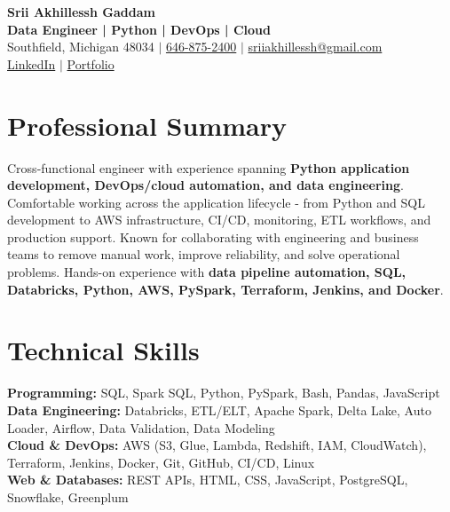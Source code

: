 \documentclass[letterpaper,10pt]{article}
\begin{document}
\fontsize{9.35pt}{10.45pt}\selectfont

\begin{center}
    {\LARGE \textbf{Srii Akhillessh Gaddam}} \\[-1pt]
    \textbf{Data Engineer | Python | DevOps | Cloud} \\[2pt]
    Southfield, Michigan 48034 $|$
    \href{tel:6468752400}{646-875-2400} $|$
    \href{mailto:sriiakhillessh@gmail.com}{sriiakhillessh@gmail.com} \\[1pt]
    \href{https://www.linkedin.com/in/srii-akhiilessh-gaddam-b48668191/}{LinkedIn} $|$
    \href{https://sriiakhillesshg.github.io/portfolio/}{Portfolio}
\end{center}
\vspace{-8pt}

\section{Professional Summary}
\small{Cross-functional engineer with experience spanning \textbf{Python application development, DevOps/cloud automation, and data engineering}. Comfortable working across the application lifecycle - from Python and SQL development to AWS infrastructure, CI/CD, monitoring, ETL workflows, and production support. Known for collaborating with engineering and business teams to remove manual work, improve reliability, and solve operational problems. Hands-on experience with \textbf{data pipeline automation, SQL, Databricks, Python, AWS, PySpark, Terraform, Jenkins, and Docker}.}

\section{Technical Skills}
\small{
\textbf{Programming:} SQL, Spark SQL, Python, PySpark, Bash, Pandas, JavaScript \\
\textbf{Data Engineering:} Databricks, ETL/ELT, Apache Spark, Delta Lake, Auto Loader, Airflow, Data Validation, Data Modeling \\
\textbf{Cloud \& DevOps:} AWS (S3, Glue, Lambda, Redshift, IAM, CloudWatch), Terraform, Jenkins, Docker, Git, GitHub, CI/CD, Linux \\
\textbf{Web \& Databases:} REST APIs, HTML, CSS, JavaScript, PostgreSQL, Snowflake, Greenplum
}

\end{document}
